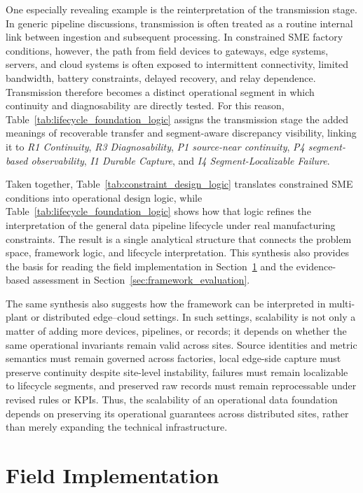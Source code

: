 \documentclass[systems,article,submit,pdftex,moreauthors]{Definitions/mdpi}
\begin{document}
One especially revealing example is the reinterpretation of the transmission stage. In generic pipeline discussions, transmission is often treated as a routine internal link between ingestion and subsequent processing. In constrained SME factory conditions, however, the path from field devices to gateways, edge systems, servers, and cloud systems is often exposed to intermittent connectivity, limited bandwidth, battery constraints, delayed recovery, and relay dependence. Transmission therefore becomes a distinct operational segment in which continuity and diagnosability are directly tested. For this reason, Table~\ref{tab:lifecycle_foundation_logic} assigns the transmission stage the added meanings of recoverable transfer and segment-aware discrepancy visibility, linking it to \emph{R1 Continuity}, \emph{R3 Diagnosability}, \emph{P1 source-near continuity}, \emph{P4 segment-based observability}, \emph{I1 Durable Capture}, and \emph{I4 Segment-Localizable Failure}.

Taken together, Table~\ref{tab:constraint_design_logic} translates constrained SME conditions into operational design logic, while Table~\ref{tab:lifecycle_foundation_logic} shows how that logic refines the interpretation of the general data pipeline lifecycle under real manufacturing constraints. The result is a single analytical structure that connects the problem space, framework logic, and lifecycle interpretation. This synthesis also provides the basis for reading the field implementation in Section~\ref{sec:field_implementation} and the evidence-based assessment in Section~\ref{sec:framework_evaluation}.

The same synthesis also suggests how the framework can be interpreted in multi-plant or distributed edge--cloud settings. In such settings, scalability is not only a matter of adding more devices, pipelines, or records; it depends on whether the same operational invariants remain valid across sites. Source identities and metric semantics must remain governed across factories, local edge-side capture must preserve continuity despite site-level instability, failures must remain localizable to lifecycle segments, and preserved raw records must remain reprocessable under revised rules or KPIs. Thus, the scalability of an operational data foundation depends on preserving its operational guarantees across distributed sites, rather than merely expanding the technical infrastructure.

\section{Field Implementation}
\label{sec:field_implementation}
\end{document}
